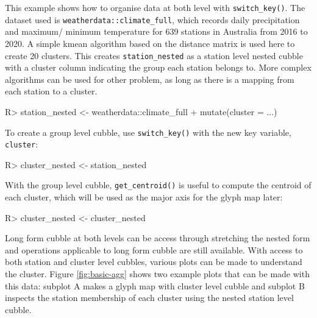 \documentclass[
]{jss}
\begin{document}
This example shows how to organise data at both level with
\texttt{switch\_key()}. The dataset used is
\texttt{weatherdata::climate\_full}, which records daily precipitation
and maximum/ minimum temperature for 639 stations in Australia from 2016
to 2020. A simple kmean algorithm based on the distance matrix is used
here to create 20 clusters. This creates \texttt{station\_nested} as a
station level nested cubble with a cluster column indicating the group
each station belongs to. More complex algorithms can be used for other
problem, as long as there is a mapping from each station to a cluster.

\begin{CodeChunk}
\begin{CodeInput}
R> station_nested <- weatherdata::climate_full %
+   mutate(cluster = ...)
\end{CodeInput}
\end{CodeChunk}

To create a group level cubble, use \texttt{switch\_key()} with the new
key variable, \texttt{cluster}:

\begin{CodeChunk}
\begin{CodeInput}
R> cluster_nested <- station_nested %
\end{CodeInput}
\end{CodeChunk}

With the group level cubble, \texttt{get\_centroid()} is useful to
compute the centroid of each cluster, which will be used as the major
axis for the glyph map later:

\begin{CodeChunk}
\begin{CodeInput}
R> cluster_nested <- cluster_nested %
\end{CodeInput}
\end{CodeChunk}

Long form cubble at both levels can be access through stretching the
nested form and operations applicable to long form cubble are still
available. With access to both station and cluster level cubbles,
various plots can be made to understand the cluster. Figure
\ref{fig:basic-agg} shows two example plots that can be made with this
data: subplot A makes a glyph map with cluster level cubble and subplot
B inspects the station membership of each cluster using the nested
station level cubble.
\end{document}
